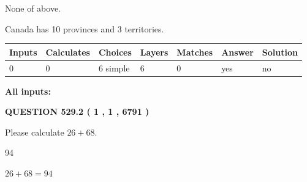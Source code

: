 \documentclass[12pt]{article}
\begin{document}
 
 None of above.
 
 
\noindent{}
 
 
Canada has 10  provinces and 3 territories.
 
 
\noindent{}
 
 
   
   
   
   
\noindent\begin{tabular}{|l|l|l|l|l|l|l|}
 \hline
Inputs & Calculates & Choices & Layers & Matches & Answer & Solution \\ \hline
 0  & 
 0  & 
 6
  simple  
  & 
 6  & 
 0  & 
  yes & 
  no 
  \\ \hline
 \end{tabular}
   
   
   
   
\noindent{}
   
   
   
   
\noindent\vspace{0.1in}\hspace{-0.08in} {\textbf{\Large{All inputs: }}}
   
   
  
\vspace{0.2in}
  
{\textbf{\Large{QUESTION
529.2 
 ( 1 , 1 , 6791 )
}}}
  
  
 
Please calculate $ %
26 +  %
68 $.
 
 
 
\noindent{}
 
 

94
 
 
\noindent{}
 
 

 
 
 
\noindent{}
 
 

$ %
26 +  %
68=   %
94$
 
\end{document}
